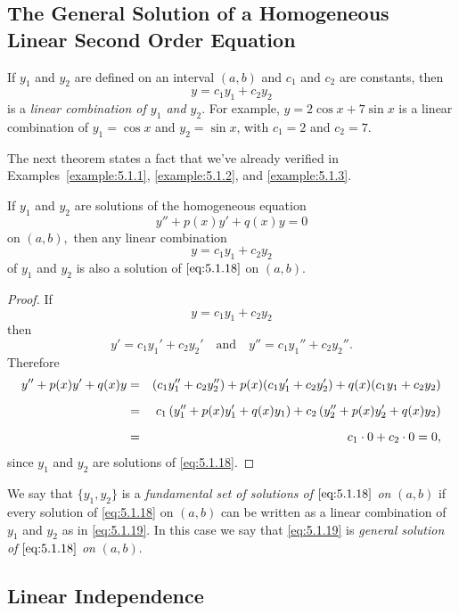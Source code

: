 \documentclass{ximera}
\begin{document}
\subsection*{The General Solution of a Homogeneous Linear Second Order
Equation}

If $y_1$ and $y_2$ are defined on an interval
$(a,b)$ and $c_1$ and $c_2$ are constants, then
$$
y=c_1y_1+c_2y_2
$$
is a \textit{linear combination of $y_1$ and $y_2$}. For
example, $y=2\cos x+7 \sin x$ is a linear combination of $y_1=
\cos x$ and $y_2=\sin x$, with $c_1=2$ and $c_2=7$.

The next theorem states a fact that we've already verified in
Examples~\ref{example:5.1.1}, \ref{example:5.1.2}, and \ref{example:5.1.3}.

\begin{theorem}\label{thmtype:5.1.2}
If $y_1$ and $y_2$ are solutions of the homogeneous equation
\begin{equation}\label{eq:5.1.18}
y''+p(x)y'+q(x)y=0
\end{equation}
on $(a,b),$ then any linear combination
\begin{equation}\label{eq:5.1.19}
y=c_1y_1+c_2y_2
\end{equation}
of $y_1$ and $y_2$ is also a solution of $\eqref{eq:5.1.18}$ on $(a,b).$
\end{theorem}

\begin{proof}
 If
$$
y=c_1y_1+c_2y_2
$$
 then
$$
y'=c_1y_1'+c_2y_2'\quad\mbox{and}\quad y''=c_1y_1''+c_2y_2''.
$$
Therefore
\begin{eqnarray*}
y''+p(x)y'+q(x)y&=&(c_1y_1''+c_2y_2'')+p(x)(c_1y_1'+c_2y_2')
+q(x)(c_1y_1+c_2y_2)\\[2\jot]
&=&c_1\left(y_1''+p(x)y_1'+q(x)y_1\right)
+c_2\left(y_2''+p(x)y_2'+q(x)y_2\right)\\[2\jot]
&=&c_1\cdot0+c_2\cdot0=0,
\end{eqnarray*}
since $y_1$ and $y_2$ are solutions of \eqref{eq:5.1.18}.  
\end{proof}
We say that  $\{y_1,y_2\}$ is a \textit{fundamental set of
solutions of $\eqref{eq:5.1.18}$ on}  $(a,b)$ if every solution
of \eqref{eq:5.1.18} on  $(a,b)$ can be written as a linear
combination of $y_1$ and $y_2$ as in \eqref{eq:5.1.19}.
In this case we say that \eqref{eq:5.1.19} is
\textit{general solution of $\eqref{eq:5.1.18}$ on}  $(a,b)$.

\subsection*{Linear Independence}
\end{document}
